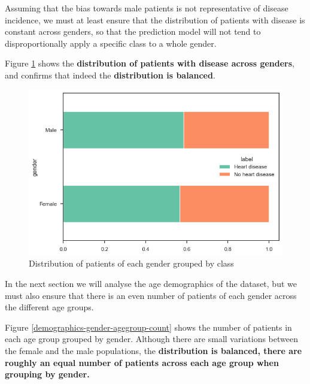 Assuming that the bias towards male patients is not representative of disease incidence, we must at least
ensure that the distribution of patients with disease is constant across genders, so that the prediction
model will not tend to disproportionally apply a specific class to a whole gender.

Figure \ref{demographics-gender-target-percent} shows the \textbf{distribution of patients with disease across genders},
and confirms that indeed the \textbf{distribution is balanced}.

\begin{figure}
    \caption{Distribution of patients of each gender grouped by class}\label{demographics-gender-target-percent}
    \centering
    \includegraphics[width=\linewidth]{media/demographics-04-gender-target-percentage.png}
\end{figure}

In the next section we will analyse the age demographics of the dataset, but we must also ensure that
there is an even number of patients of each gender across the different age groups. 

Figure \ref{demographics-gender-agegroup-count} shows the number of patients in each age group grouped by
gender. Although there are small variations between the female and the male populations, the
\textbf{distribution is balanced, there are roughly an equal number of patients across each age group when
grouping by gender.}

